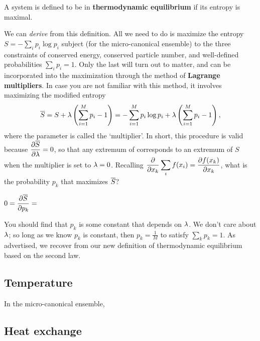 \begin{shaded}
  A system is defined to be in \textbf{thermodynamic equilibrium} if its entropy is maximal.
\end{shaded}

We can \textit{derive}  from this definition.
All we need to do is maximize the entropy $S = - \sum_i p_i \log p_i$ subject (for the micro-canonical ensemble) to the three constraints of conserved energy, conserved particle number, and well-defined probabilities $\sum_i p_i = 1$.
Only the last will turn out to matter, and can be incorporated into the maximization through the method of \textbf{Lagrange multipliers}.
In case you are not familiar with this method, it involves maximizing the modified entropy
\begin{equation*}
  \overline S = S + \lambda\left(\sum_{i = 1}^M p_i - 1\right) = - \sum_{i = 1}^M p_i \log p_i + \lambda\left(\sum_{i = 1}^M p_i - 1\right),
\end{equation*}
where the parameter \la is called the `multiplier'.
In short, this procedure is valid because $\displaystyle \frac{\partial \overline S}{\partial \lambda} = 0$, so that any extremum of \Sbar corresponds to an extremum of $S$ when the multiplier is set to $\lambda = 0$.
Recalling $\displaystyle \frac{\partial }{\partial x_k} \sum_i f(x_i) = \frac{\partial f(x_k)}{\partial x_k}$, what is the probability $p_k$ that maximizes $\overline S$?
\begin{mdframed}
  $\displaystyle 0 = \frac{\partial \overline S}{\partial p_k} = $ \\[100 pt]
\end{mdframed}
You should find that $p_k$ is some constant that depends on $\lambda$.
We don't care about $\lambda$; so long as we know $p_k$ is constant, then $p_k = \frac{1}{M}$ to satisfy $\sum_k p_k = 1$.
As advertised, we recover  from our new definition of thermodynamic equilibrium based on the second law.



\subsection{Temperature}
In the micro-canonical ensemble, 



\newpage %
\subsection{Heat exchange}
